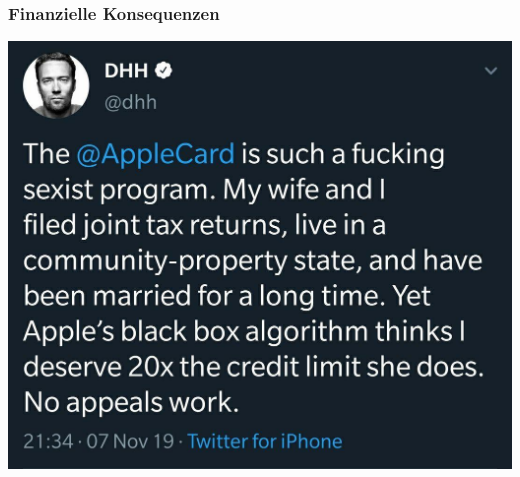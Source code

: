 \documentclass[aspectratio=43,x11names]{beamer}
\begin{document}
\begin{frame}
\frametitle{Finanzielle Konsequenzen}
\begin{center}
\includegraphics[scale=0.3]{images/apple_0}
\end{center}


\end{frame}
\end{document}
